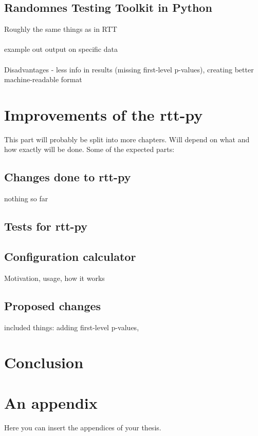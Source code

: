 \documentclass[
  digital,     %
  oneside,     %
  nosansbold,  %
  nocolorbold, %
  nolof,         %
  nolot,         %
]{fithesis4}
\begin{document}
\section{Randomnes Testing Toolkit in Python}
Roughly the same things as in RTT\\
\\

example out output on specific data\\
\\
Disadvantages - less info in results (missing first-level p-values), creating better machine-readable format




\chapter{Improvements of the rtt-py}
This part will probably  be split into more chapters. Will depend on what and how exactly will be done. Some of the expected parts:
\section{Changes done to rtt-py}
nothing so far
\section{Tests for rtt-py}
\section{Configuration calculator}
Motivation, usage, how it works
\section{Proposed changes}
included things: adding first-level p-values, 

\chapter{Conclusion}






\appendix %
\chapter{An appendix}
Here you can insert the appendices of your thesis.
\end{document}
